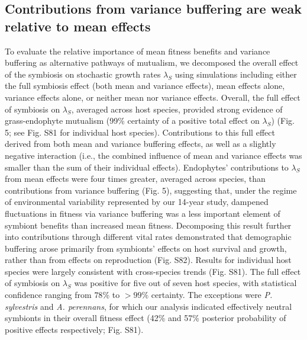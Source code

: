 \documentclass[lineno, sn-basic]{sn-jnl}%
\begin{document}
\subsection*{Contributions from variance buffering are weak relative to mean effects}
To evaluate the relative importance of mean fitness benefits and variance buffering as alternative pathways of mutualism, we decomposed  the overall effect of the symbiosis on stochastic growth rates $\lambda_{S}$ using simulations including either the full symbiosis effect (both mean and variance effects), mean effects alone, variance effects alone, or neither mean nor variance effects. 
Overall, the full effect of symbiosis on $\lambda_{S}$, averaged across host species, provided strong evidence of grass-endophyte mutualism (99\% certainty of a positive total effect on $\lambda_S$) (Fig. 5; see Fig. S81 for individual host species).
Contributions to this full effect derived from both mean and variance buffering effects, as well as a slightly negative interaction (i.e., the combined influence of mean and variance effects was smaller than the sum of their individual effects). 
Endophytes' contributions to  $\lambda_{S}$ from mean effects were four times greater, averaged across species, than contributions from variance buffering (Fig. 5), suggesting that, under the regime of environmental variability represented by our 14-year study, dampened fluctuations in fitness via variance buffering was a less important element of symbiont benefits than increased mean fitness. 
Decomposing this result further into contributions through different vital rates demonstrated that demographic buffering arose primarily from symbionts' effects on host survival and growth, rather than from effects on reproduction (Fig. S82).
Results for individual host species were largely consistent with cross-species trends (Fig. S81). 
The full effect of symbiosis on $\lambda_{S}$ was positive for five out of seven host species, with statistical confidence ranging from $78\%$ to $>99\%$ certainty.
The exceptions were \emph{P. sylvestris} and \emph{A. perennans}, for which our analysis indicated effectively neutral symbionts in their overall fitness effect (42\% and 57\% posterior probability of positive effects respectively; Fig. S81). 
\end{document}

